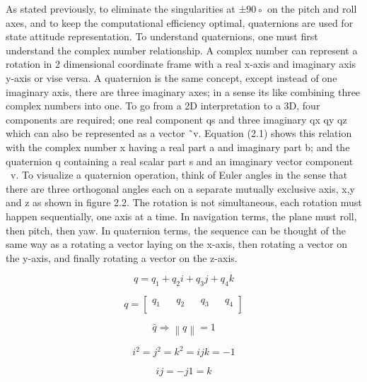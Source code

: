 As stated previously, to eliminate the singularities at ±90◦ on the pitch and roll axes, and
to keep the computational efficiency optimal, quaternions are used for state attitude representation. To understand quaternions, one must first understand the complex number
relationship. A complex number can represent a rotation in 2 dimensional coordinate frame
with a real x-axis and imaginary axis y-axis or vise versa.
A quaternion is the same concept, except instead of one imaginary axis, there are three
imaginary axes; in a sense its like combining three complex numbers into one. To go from a
2D interpretation to a 3D, four components are required; one real component qs and three
imaginary qx qy qz which can also be represented as a vector ˜v. Equation (2.1) shows this
relation with the complex number x having a real part a and imaginary part b; and the
quaternion q containing a real scalar part s and an imaginary vector component ~v.
To visualize a quaternion operation, think of Euler angles in the sense that there are
three orthogonal angles each on a separate mutually exclusive axis, x,y and z as shown in
figure 2.2. The rotation is not simultaneous, each rotation must happen sequentially, one
axis at a time. In navigation terms, the plane must roll, then pitch, then yaw. In quaternion
terms, the sequence can be thought of the same way as a rotating a vector laying on the
x-axis, then rotating a vector on the y-axis, and finally rotating a vector on the z-axis.

\begin{equation}
    q = q_1 + q_2 i + q_3 j + q_4 k
\end{equation}

\begin{equation}
    q =     \begin{bmatrix}
        q_1 &  & q_2 &  & q_3 &  & q_4 \\
    \end{bmatrix}
\end{equation}

\begin{equation}
    \hat{q} \Longrightarrow \left\lVert q\right\rVert =1
\end{equation}

\begin{equation}
    i^2=j^2=k^2=ijk=-1
\end{equation}

\begin{equation}
    ij = -j1 = k
\end{equation}

